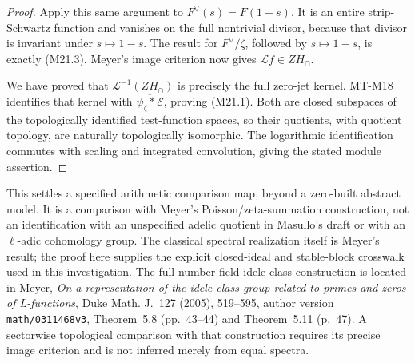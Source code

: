 \begin{proof}
Apply this same argument to \(F^\vee(s)=F(1-s)\).
It is an entire strip-Schwartz function and vanishes on
the full nontrivial divisor, because that divisor is
invariant under \(s\mapsto1-s\). The result for
\(F^\vee/\zeta\), followed by \(s\mapsto1-s\),
is exactly (M21.3). Meyer's image criterion now gives
\(\mathcal Lf\in ZH_\cap\).

We have proved that \(\mathcal L^{-1}(ZH_\cap)\)
is precisely the full zero-jet kernel. MT-M18 identifies
that kernel with \(\overline{\psi_\zeta*\mathcal E}\),
proving (M21.1). Both are closed subspaces of the
topologically identified test-function spaces, so their
quotients, with quotient topology, are naturally
topologically isomorphic. The logarithmic identification
commutes with scaling and integrated convolution, giving
the stated module assertion.
\end{proof}

This settles a specified arithmetic comparison map, beyond
a zero-built abstract model. It is a comparison with
Meyer's Poisson/zeta-summation construction, not an
identification with an unspecified adelic quotient in
Masullo's draft or with an \(\ell\)-adic cohomology group.
The classical spectral realization itself is Meyer's
result; the proof here supplies the explicit closed-ideal
and stable-block crosswalk used in this investigation.
The full number-field idele-class construction is located
in Meyer, \emph{On a representation of the idele class
group related to primes and zeros of L-functions},
Duke Math. J.~127 (2005), 519--595, author version
\texttt{math/0311468v3}, Theorem~5.8 (pp.~43--44) and
Theorem~5.11 (p.~47). A sectorwise topological comparison
with that construction requires its precise image
criterion and is not inferred merely from equal spectra.
